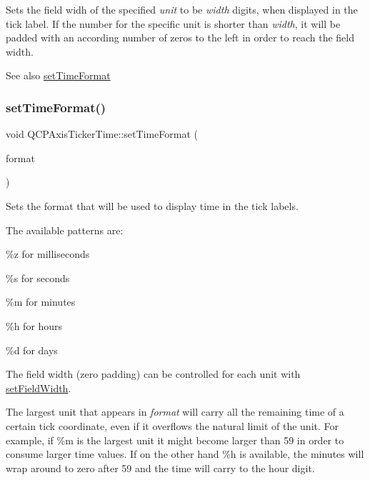 Sets the field widh of the specified {\itshape unit} to be {\itshape width} digits, when displayed in the tick label. If the number for the specific unit is shorter than {\itshape width}, it will be padded with an according number of zeros to the left in order to reach the field width.

\begin{DoxySeeAlso}{See also}
\mbox{\hyperlink{class_q_c_p_axis_ticker_time_a2f30b6e5125bce4256be9ce3177088ea}{set\+Time\+Format}} 
\end{DoxySeeAlso}
\mbox{\label{class_q_c_p_axis_ticker_time_a2f30b6e5125bce4256be9ce3177088ea}} 
\subsubsection{\texorpdfstring{setTimeFormat()}{setTimeFormat()}}
{\footnotesize\ttfamily void Q\+C\+P\+Axis\+Ticker\+Time\+::set\+Time\+Format (\begin{DoxyParamCaption}\item[{const Q\+String \&}]{format }\end{DoxyParamCaption})}

Sets the format that will be used to display time in the tick labels.

The available patterns are\+:
\begin{DoxyItemize}
\item \%z for milliseconds
\item \%s for seconds
\item \%m for minutes
\item \%h for hours
\item \%d for days
\end{DoxyItemize}

The field width (zero padding) can be controlled for each unit with \mbox{\hyperlink{class_q_c_p_axis_ticker_time_adc13e54fc969be98a5c0e3fa0dbaa293}{set\+Field\+Width}}.

The largest unit that appears in {\itshape format} will carry all the remaining time of a certain tick coordinate, even if it overflows the natural limit of the unit. For example, if \%m is the largest unit it might become larger than 59 in order to consume larger time values. If on the other hand \%h is available, the minutes will wrap around to zero after 59 and the time will carry to the hour digit. \mbox{\label{class_q_c_p_axis_ticker_time_a99ad61dc7434a7fed1850e96bf748834}} 
